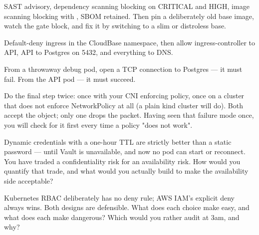 SAST advisory, dependency scanning blocking on CRITICAL and HIGH, image scanning blocking with , SBOM retained. Then pin a deliberately old base image, watch the gate block, and fix it by switching to a slim or distroless base.

Default-deny ingress in the CloudBase namespace, then allow ingress-controller to API, API to Postgres on 5432, and everything to DNS.

From a throwaway debug pod, open a TCP connection to Postgres --- it must fail. From the API pod --- it must succeed.

\begin{prodtip}
Do the final step twice: once with your CNI enforcing policy, once on a cluster that does not enforce NetworkPolicy at all (a plain kind cluster will do). Both accept the object; only one drops the packet. Having seen that failure mode once, you will check for it first every time a policy "does not work".
\end{prodtip}


\begin{thinkbox}
Dynamic credentials with a one-hour TTL are strictly better than a static password --- until Vault is unavailable, and now no pod can start or reconnect. You have traded a confidentiality risk for an availability risk. How would you quantify that trade, and what would you actually build to make the availability side acceptable?
\end{thinkbox}

\begin{thinkbox}
Kubernetes RBAC deliberately has no deny rule; AWS IAM's explicit deny always wins. Both designs are defensible. What does each choice make easy, and what does each make dangerous? Which would you rather audit at 3am, and why?
\end{thinkbox}

